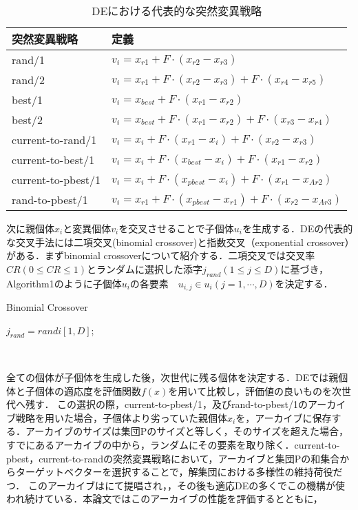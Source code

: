 \documentclass[a4paper,11pt,oneside,openany]{jsbook}
\begin{document}
\begin{table}[htb]
  \begin{center}
    \begin{tabular}{ll} \hline
      突然変異戦略　& 定義  \\ \hline
      rand/1 & $v_{i} = x_{r1} + F\cdot(x_{r2} - x_{r3})$ \\
      rand/2 & $v_{i} = x_{r1} + F\cdot(x_{r2} - x_{r3}) + F\cdot(x_{r4} - x_{r5})$ \\
      best/1 & $v_{i} = x_{best} + F\cdot(x_{r1} - x_{r2})$ \\
      best/2 & $v_{i} = x_{best} + F\cdot(x_{r1} - x_{r2}) + F\cdot(x_{r3} - x_{r4})$ \\
      current-to-rand/1 & $v_{i} = x_{i} + F\cdot(x_{r1} - x_{i}) + F\cdot(x_{r2} - x_{r3})$ \\
      current-to-best/1 & $v_{i} = x_{i} + F\cdot(x_{best} - x_{i}) + F\cdot(x_{r1} - x_{r2})$ \\
      current-to-pbest/1 & $v_{i} = x_{i} + F\cdot(x_{pbest} - x_{i}) + F\cdot(x_{r1} - x_{Ar2})$ \\
      rand-to-pbest/1 & $v_{i} = x_{r1} + F\cdot(x_{pbest} - x_{r1}) + F\cdot(x_{r2} - x_{Ar3})$ \\ \hline
    \end{tabular}
    \caption{DEにおける代表的な突然変異戦略}
  \end{center}
\end{table}


次に親個体$x_i$と変異個体$v_i$を交叉させることで子個体$u_i$を生成する．DEの代表的な交叉手法には二項交叉(binomial crossover)と指数交叉（exponential crossover）がある．まずbinomial crossoverについて紹介する．二項交叉では交叉率$CR(0 \leq CR \leq 1)$とランダムに選択した添字$j_{rand}(1 \leq j \leq D)$に基づき，Algorithm1のように子個体$u_i$の各要素　$u_{i,j} \in u_{i}(j = 1, \cdots, D)$を決定する．

\begin{algorithm}                      
\caption{Binomial Crossover}         
\label{alg:pbnf}                          
\begin{algorithmic}  
\STATE $j_{rand} = randi[1, D]$;
  \IF {$rand[0,1)　\leq CR　|| j == j_{rand} $}
  \ELSE
  \ENDIF
\ENDFOR
\end{algorithmic}
\end{algorithm}　

全ての個体が子個体を生成した後，次世代に残る個体を決定する．DEでは親個体と子個体の適応度を評価関数$f(x)$を用いて比較し，評価値の良いものを次世代へ残す．
この選択の際，current-to-pbest/1，及びrand-to-pbest/1のアーカイブ戦略を用いた場合，子個体より劣っていた親個体$x_{i}$を，アーカイブに保存する．アーカイブのサイズは集団Pのサイズと等しく，そのサイズを超えた場合，すでにあるアーカイブの中から，ランダムにその要素を取り除く．current-to-pbest，current-to-randの突然変異戦略において，アーカイブと集団Pの和集合からターゲットベクターを選択することで，解集団における多様性の維持荷役だつ．
このアーカイブは\cite{JADE}にて提唱され，，その後も適応DEの多くでこの機構が使われ続けている．本論文ではこのアーカイブの性能を評価するとともに，
\end{document}
